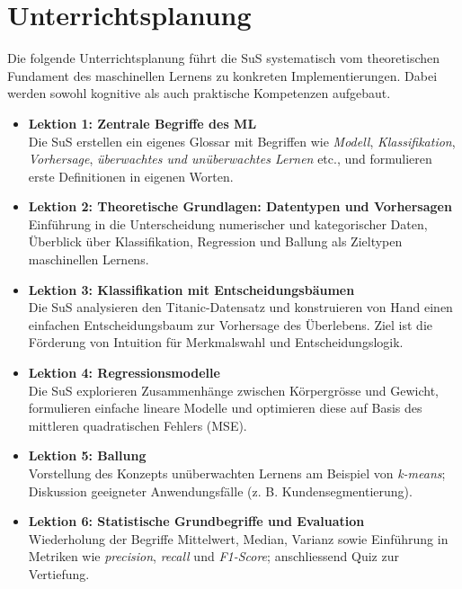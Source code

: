 \documentclass[twocolumn]{article}
\begin{document}
\section{Unterrichtsplanung}
\label{sec:planung}

Die folgende Unterrichtsplanung führt die SuS systematisch vom theoretischen Fundament des maschinellen Lernens zu konkreten Implementierungen. Dabei werden sowohl kognitive als auch praktische Kompetenzen aufgebaut.

\begin{itemize}[itemsep=0.3em, parsep=0pt, topsep=0em]
  \item \textbf{Lektion 1: Zentrale Begriffe des ML}\\
  Die SuS erstellen ein eigenes Glossar mit Begriffen wie \emph{Modell}, \emph{Klassifikation}, \emph{Vorhersage}, \emph{überwachtes und unüberwachtes Lernen} etc., und formulieren erste Definitionen in eigenen Worten.

  \item \textbf{Lektion 2: Theoretische Grundlagen: Datentypen und Vorhersagen}\\
  Einführung in die Unterscheidung numerischer und kategorischer Daten, Überblick über Klassifikation, Regression und Ballung als Zieltypen maschinellen Lernens.

  \item \textbf{Lektion 3: Klassifikation mit Entscheidungsbäumen}\\
  Die SuS analysieren den Titanic-Datensatz und konstruieren von Hand einen einfachen Entscheidungsbaum zur Vorhersage des Überlebens. Ziel ist die Förderung von Intuition für Merkmalswahl und Entscheidungslogik.

  \item \textbf{Lektion 4: Regressionsmodelle}\\
  Die SuS explorieren Zusammenhänge zwischen Körpergrösse und Gewicht, formulieren einfache lineare Modelle und optimieren diese auf Basis des mittleren quadratischen Fehlers (MSE).

  \item \textbf{Lektion 5: Ballung}\\
  Vorstellung des Konzepts unüberwachten Lernens am Beispiel von \emph{k-means}; Diskussion geeigneter Anwendungsfälle (z. B. Kundensegmentierung).

  \item \textbf{Lektion 6: Statistische Grundbegriffe und Evaluation}\\
  Wiederholung der Begriffe Mittelwert, Median, Varianz sowie Einführung in Metriken wie \emph{precision}, \emph{recall} und \emph{F1-Score}; anschliessend Quiz zur Vertiefung.


\end{itemize}
\end{document}
